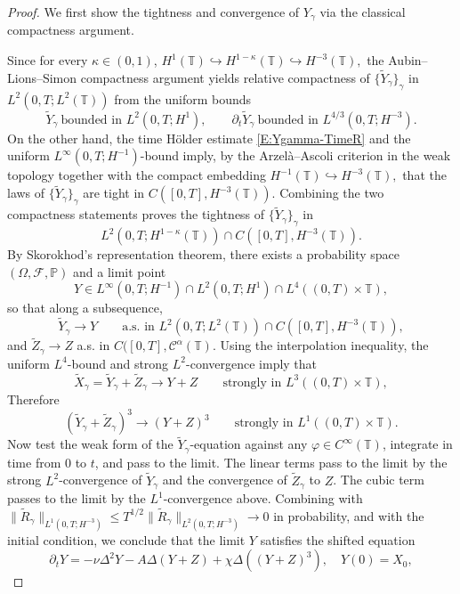 \documentclass{article}
\begin{document}
\begin{proof}
We first show the tightness and convergence of $Y_{\gamma}$ via the classical compactness argument.

Since for every $\kappa \in (0,1)$,
\(
H^1(\mathbb T)\hookrightarrow H^{1-\kappa}(\mathbb T)
\hookrightarrow H^{-3}(\mathbb T),
\)
the Aubin--Lions--Simon compactness argument yields relative compactness of
\(\{\widetilde Y_\gamma\}_\gamma\) in \(L^2(0,T;L^2(\mathbb T))\) from the uniform bounds
\[
\widetilde Y_\gamma
\ \text{bounded in }L^2(0,T;H^1),
\qquad
\partial_t\widetilde Y_\gamma
\ \text{bounded in }L^{4/3}(0,T;H^{-3}).
\]
On the other hand, the time Hölder estimate \eqref{E:Ygamma-TimeR} and the uniform
\(L^\infty(0,T;H^{-1})\)-bound imply, by the Arzel\`a--Ascoli criterion in the weak topology together with the compact embedding
\(
H^{-1}(\mathbb T) \hookrightarrow H^{-3}(\mathbb T),
\)
that the laws of \(\{\widetilde Y_\gamma\}_\gamma\) are tight in
\(
C([0,T],H^{-3}(\mathbb T)).
\)
Combining the two compactness statements proves the tightness of \(\{\widetilde Y_\gamma\}_\gamma\) in
\[
L^2(0,T;H^{1-\kappa}(\mathbb T))\cap C([0,T],H^{-3}(\mathbb T)).
\]
By Skorokhod's representation theorem, there exists a probability space $(\Omega, \mathcal{F}, \mathbb P)$ and a limit point
\[
Y \in L^\infty(0,T;H^{-1})
\cap
L^2(0,T;H^1)
\cap
L^4((0,T)\times\mathbb T),
\]
so that along a subsequence,
\[
\widetilde Y_\gamma\to Y
\qquad\text{a.s. in }L^2(0,T;L^2(\mathbb T))\cap C([0,T],H^{-3}(\mathbb T)),
\]
and $\widetilde Z_\gamma\to Z$ a.s. in $C([0,T],\mathcal C^\alpha(\mathbb T)$.
Using the interpolation inequality, the uniform \(L^4\)-bound and strong \(L^2\)-convergence imply that
\[
\widetilde X_{\gamma} = \widetilde Y_\gamma+\widetilde Z_\gamma\to Y+Z
\qquad\text{strongly in }L^3((0,T)\times\mathbb T),
\]
Therefore
\[
(\widetilde Y_\gamma+\widetilde Z_\gamma)^3
\to
(Y+Z)^3
\qquad\text{strongly in }L^1((0,T)\times\mathbb T).
\]
Now test the weak form of the \(\widetilde Y_\gamma\)-equation against any \(\varphi\in C^\infty(\mathbb T)\), integrate in time from \(0\) to \(t\), and pass to the limit.
The linear terms pass to the limit by the strong \(L^2\)-convergence of \(\widetilde Y_\gamma\) and the convergence of \(\widetilde Z_\gamma\) to \(Z\).
The cubic term passes to the limit by the \(L^1\)-convergence above.
Combining with
\(\|\widetilde R_\gamma\|_{L^1(0,T;H^{-3})}
\le T^{1/2}\|\widetilde R_\gamma\|_{L^2(0,T;H^{-3})}\to0\)
in probability, and with the initial condition,
we conclude that the limit \(Y\) satisfies the shifted equation
\[
\partial_t Y
=
- \nu\Delta^2Y - A\Delta(Y+Z)+ \chi\Delta((Y+Z)^3), \quad Y(0)=X_0,
\]
\end{proof}
\end{document}
